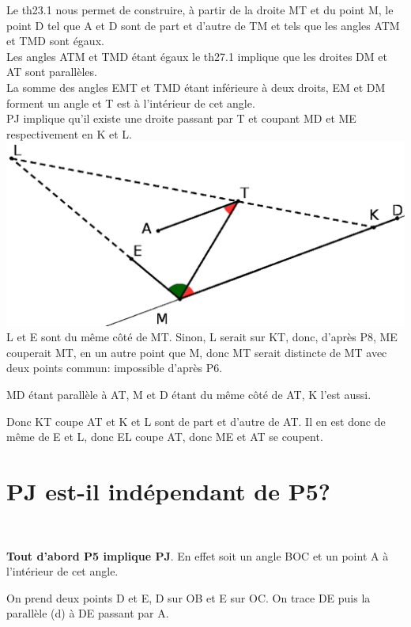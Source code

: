 \documentclass[a4paper, 12pt, twoside]{book}
\begin{document}
 Le th23.1 nous permet de construire, à partir de la droite MT et du point M, le point D tel que A et D sont de part et d'autre de TM et tels que les angles  ATM et TMD sont égaux.\\

 Les angles  ATM et TMD étant égaux le th27.1 implique que les droites DM et AT sont parallèles.\\

La somme des angles EMT et TMD étant inférieure à deux droits, EM et DM forment un angle et T est à l'intérieur de cet angle.\\

PJ implique qu'il existe une droite passant par T et coupant MD et ME respectivement en K et L.\\

\includegraphics[scale=0.7]{figures/ALJAHW6.eps} \\



L et E sont du même côté de MT. Sinon, L serait sur KT, donc, d'après P8, ME couperait MT, en un autre point que M, donc MT serait distincte de MT avec deux points commun: impossible d'après P6.\ 

MD étant parallèle à AT, M et D étant du même côté de AT,  K l'est aussi.\

Donc KT coupe AT et K et L sont de part et d'autre de AT. Il en est donc de même de E et L, donc EL coupe AT, donc ME et AT se coupent.\


  
  \newpage \section{PJ est-il indépendant de P5?}\
  
  \textbf{Tout d'abord P5 implique PJ}. En effet soit un angle BOC et un point A à l'intérieur de cet angle.\
  
  On prend deux points D et E, D sur OB et E sur OC. On trace DE puis la parallèle (d) à DE passant par A.\
  
\end{document}
